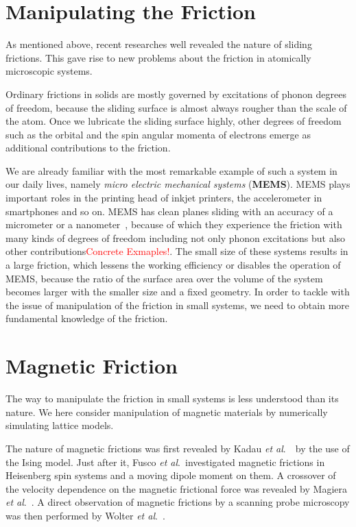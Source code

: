 \section{Manipulating the Friction}

As mentioned above, recent researches well revealed the nature of sliding frictions. This gave rise to new problems about the friction in atomically microscopic systems.

Ordinary frictions in solids are mostly governed by excitations of phonon degrees of freedom, because the sliding surface is almost always rougher than the scale of the atom. Once we lubricate the sliding surface highly, other degrees of freedom such as the orbital and the spin angular momenta of electrons emerge as additional contributions to the friction.

We are already familiar with the most remarkable example of such a system in our daily lives, namely \textit{micro electric mechanical systems} (\textbf{MEMS}). MEMS plays important roles in the printing head of inkjet printers, the accelerometer in smartphones and so on. MEMS has clean planes sliding with an accuracy of a micrometer or a nanometer~\cite{Kim2007,Grierson2007,Manini2017}, because of which they experience the friction with many kinds of degrees of freedom including not only phonon excitations but also other contributions\textcolor{red}{Concrete Exmaples!}. The small size of these systems results in a large friction, which lessens the working efficiency or disables the operation of MEMS, because the ratio of the surface area over the volume of the system becomes larger with the smaller size and a fixed geometry. In order to tackle with the issue of manipulation of the friction in small systems, we need to obtain more fundamental knowledge of the friction.

\section{Magnetic Friction}
The way to manipulate the friction in small systems is less understood than its nature. We here consider manipulation of magnetic materials by numerically simulating lattice models. 

The nature of magnetic frictions was first revealed by Kadau \textit{et al}.~\cite{Kadau2008}\ by the use of the Ising model. Just after it, Fusco \textit{et al}.\ investigated magnetic frictions in Heisenberg spin systems and a moving dipole moment on them. A crossover of the velocity dependence on the magnetic frictional force was revealed by Magiera \textit{et al}.~\cite{Magiera2011}. A direct observation of magnetic frictions by a scanning probe microscopy was then performed by Wolter \textit{et al}.~\cite{Wolter2012}.

